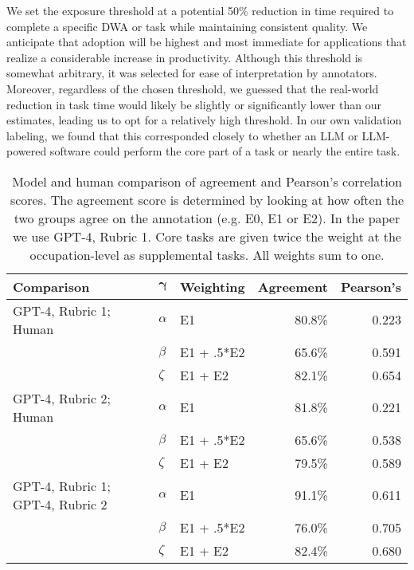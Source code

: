 \documentclass[11pt]{article}
\begin{document}
\vspace{20pt}

We set the exposure threshold at a potential 50\% reduction in time required to complete a specific DWA or task while maintaining consistent quality. We anticipate that adoption will be highest and most immediate for applications that realize a considerable increase in productivity. Although this threshold is somewhat arbitrary, it was selected for ease of interpretation by annotators. Moreover, regardless of the chosen threshold, we guessed that the real-world reduction in task time would likely be slightly or significantly lower than our estimates, leading us to opt for a relatively high threshold. In our own validation labeling, we found that this corresponded closely to whether an LLM or LLM-powered software could perform the core part of a task or nearly the entire task.

\begin{table}[h!]
\centering
\begin{tabular}{@{}lllrr@{}}
\toprule
\textbf{Comparison} & \multicolumn{1}{c}{$\mathbf{\gamma}$}& \multicolumn{1}{c}{\textbf{Weighting}} & \multicolumn{1}{c}{\textbf{Agreement}} & \multicolumn{1}{c}{\textbf{Pearson's}} \\ \midrule

GPT-4, Rubric 1; Human & $\alpha$ & E1 & 80.8\% & 0.223 \\
                                & $\beta$ & E1 + .5*E2 & 65.6\% & 0.591 \\
                                & $\zeta$ & E1 + E2 & 82.1\% & 0.654 \\ \midrule
GPT-4, Rubric 2; Human & $\alpha$ & E1 & 81.8\% & 0.221 \\
                                & $\beta$ & E1 + .5*E2 & 65.6\% & 0.538 \\
                                & $\zeta$ & E1 + E2 & 79.5\% & 0.589 \\ \midrule
GPT-4, Rubric 1; GPT-4, Rubric 2 & $\alpha$ & E1 & 91.1\% & 0.611 \\
                                  & $\beta$ & E1 + .5*E2 & 76.0\% & 0.705 \\
                                  & $\zeta$ & E1 + E2 & 82.4\% & 0.680 \\ \bottomrule
\end{tabular}
\caption{Model and human comparison of agreement and Pearson's correlation scores. The agreement score is determined by looking at how often the two groups agree on the annotation (e.g. E0, E1 or E2). In the paper we use GPT-4, Rubric 1. Core tasks are given twice the weight at the occupation-level as supplemental tasks. All weights sum to one.}
\label{tab:comparison}
\end{table}
\end{document}
